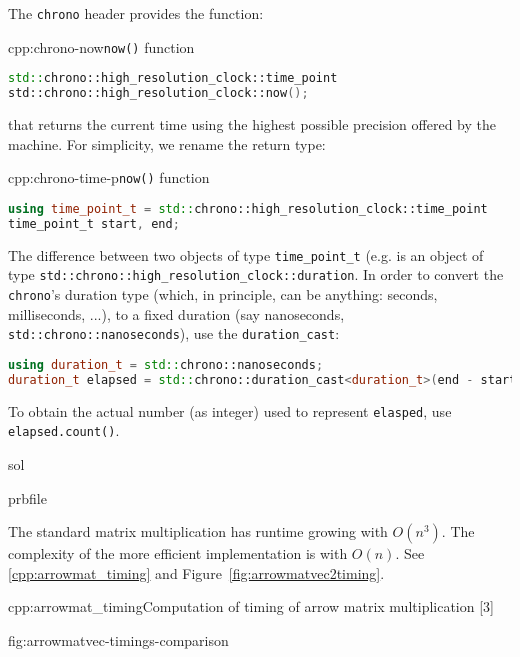 \begin{samproblem}
\begin{subproblem}{}
  The \texttt{chrono} header provides the function:
  \begin{samcode}[C++11-code]{cpp:chrono-now}{\texttt{now()} function}
    \begin{lstlisting}[language=C++, style=cpp]
std::chrono::high_resolution_clock::time_point
std::chrono::high_resolution_clock::now();
    \end{lstlisting}
  \end{samcode}
that returns the current time using the highest possible precision offered by
the machine. For simplicity, we rename the return type:
\begin{samcode}[C++11-code]{cpp:chrono-time-p}{\texttt{now()} function}
\begin{lstlisting}[language=C++, style=cpp]
using time_point_t = std::chrono::high_resolution_clock::time_point
time_point_t start, end;
\end{lstlisting}
\end{samcode}
The difference between two objects of type \texttt{time\_point\_t}
(e.g.  is an
object of type \texttt{std::chrono::high\_resolution\_clock::duration}.
In order to convert the \texttt{chrono}'s duration type (which, in principle,
can be anything: seconds, milliseconds, ...), to a fixed duration (say
nanoseconds, \texttt{std::chrono::nanoseconds}), use the \texttt{duration\_cast}:
\begin{lstlisting}[language=C++, style=cpp]
using duration_t = std::chrono::nanoseconds;
duration_t elapsed = std::chrono::duration_cast<duration_t>(end - start);
\end{lstlisting}
To obtain the actual number (as integer) used to represent \texttt{elasped}, use \texttt{elapsed.count()}.


\begin{samwriteprbpart}{sol}
    \begin{writeverbatim}{prbfile}
\begin{samsolution}
The standard matrix multiplication has runtime growing with $O(n^3)$.
The complexity of the more efficient implementation is with $O(n)$.
See \autoref{cpp:arrowmat_timing} and Figure~\ref{fig:arrowmatvec2timing}.

\begin{samcode}[C++11-code]{cpp:arrowmat_timing}{Computation of timing of arrow matrix multiplication}
[3]
\end{samcode}

{fig:arrowmatvec-timings-comparison}

\end{samsolution}
\end{writeverbatim}
\end{samwriteprbpart}
\end{subproblem}

\end{samproblem}
